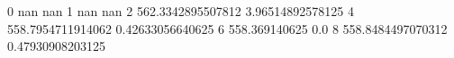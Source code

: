 0 nan nan
1 nan nan
2 562.3342895507812 3.96514892578125
4 558.7954711914062 0.42633056640625
6 558.369140625 0.0
8 558.8484497070312 0.47930908203125
